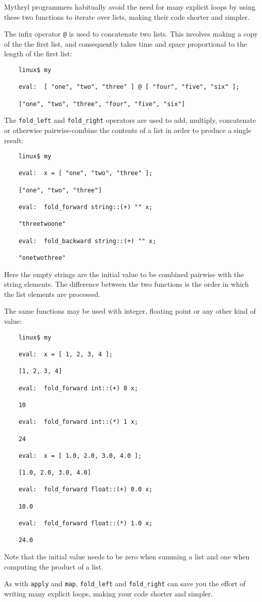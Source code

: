Mythryl programmers habitually avoid the need for many 
explicit loops by using these two functions to iterate 
over lists, making their code shorter and simpler.

The infix operator {\tt @} is used to concatenate two lists. 
This involves making a copy of the the first list, and consequently 
takes time and space proportional to the length of the first list: 

\begin{verbatim}
    linux$ my

    eval:  [ "one", "two", "three" ] @ [ "four", "five", "six" ];

    ["one", "two", "three", "four", "five", "six"]
\end{verbatim}

The {\tt fold\_left} and {\tt fold\_right} operators are used to add, 
multiply, concatenate or otherwise pairwise-combine the contents of 
a list in order to produce a single result:

\begin{verbatim}
    linux$ my

    eval:  x = [ "one", "two", "three" ];

    ["one", "two", "three"]

    eval:  fold_forward string::(+) "" x;

    "threetwoone"

    eval:  fold_backward string::(+) "" x;

    "onetwothree"

\end{verbatim}

Here the empty strings are the initial value to be combined 
pairwise with the string elements.  The difference between 
the two functions is the order in which the list elements 
are processed.

The same functions may 
be used with integer, floating point or any other kind of 
value:

\begin{verbatim}
    linux$ my

    eval:  x = [ 1, 2, 3, 4 ];

    [1, 2, 3, 4]

    eval:  fold_forward int::(+) 0 x;

    10

    eval:  fold_forward int::(*) 1 x;

    24

    eval:  x = [ 1.0, 2.0, 3.0, 4.0 ];

    [1.0, 2.0, 3.0, 4.0]

    eval:  fold_forward float::(+) 0.0 x;

    10.0

    eval:  fold_forward float::(*) 1.0 x;

    24.0
\end{verbatim}

Note that the initial value needs to be zero when summing a list 
and one when computing the product of a list.

As with {\tt apply} and {\tt map}, {\tt fold\_left} and {\tt fold\_right} 
can save you the effort of writing many explicit loops, making your 
code shorter and simpler.

\cutend*
